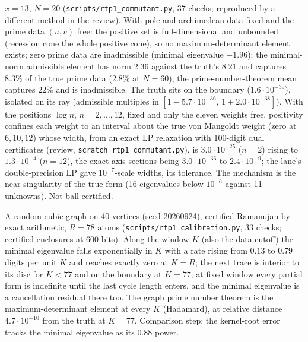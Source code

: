 \begin{numerical}
\label{num:rtp-commutant}
$x = 13$, $N = 20$ (\texttt{scripts/rtp1\_commutant.py}, 37 checks; reproduced by a different method in the
review). With pole and archimedean data fixed and the prime data $(u,v)$ free: the positive set is
full-dimensional and unbounded (recession cone the whole positive cone), so no maximum-determinant element
exists; zero prime data are inadmissible (minimal eigenvalue $-1.96$); the minimal-norm admissible element has
norm $2.36$ against the truth's $8.21$ and captures $8.3\%$ of the true prime data ($2.8\%$ at $N = 60$); the
prime-number-theorem mean captures $22\%$ and is inadmissible. The truth sits on the boundary
($1.6\cdot10^{-39}$), isolated on its ray (admissible multiples in $[1-5.7\cdot10^{-36},\,1+2.0\cdot10^{-38}]$).
With the positions $\log n$, $n = 2,\dots,12$, fixed and only the eleven weights free, positivity confines each
weight to an interval about the true von Mangoldt weight (zero at $6, 10, 12$) whose width, from an exact
LP relaxation with 100-digit dual certificates (review, \texttt{scratch\_rtp1\_commutant.py}), is
$3.0\cdot10^{-25}$ ($n = 2$) rising to $1.3\cdot10^{-4}$ ($n = 12$), the exact axis sections being $3.0\cdot10^{-36}$
to $2.4\cdot10^{-9}$; the lane's double-precision LP gave $10^{-7}$-scale widths, its tolerance. The mechanism is the near-singularity of the true form (16
eigenvalues below $10^{-6}$ against 11 unknowns). Not ball-certified.
\end{numerical}

\begin{numerical}
\label{num:rtp-calibration}
A random cubic graph on 40 vertices (seed 20260924), certified Ramanujan by exact arithmetic, $R = 78$ atoms
(\texttt{scripts/rtp1\_calibration.py}, 33 checks; certified enclosures at 600 bits). Along the window $K$ (also
the data cutoff) the minimal eigenvalue falls exponentially in $K$ with a rate rising from $0.13$ to $0.79$
digits per unit $K$ and reaches exactly zero at $K = R$; the next trace is interior to its disc for $K<77$ and
on the boundary at $K = 77$; at fixed window every partial form is indefinite until the last cycle length
enters, and the minimal eigenvalue is a cancellation residual there too. The graph prime number theorem is the
maximum-determinant element at every $K$ (Hadamard), at relative distance $4.7\cdot10^{-10}$ from the truth at
$K = 77$. Comparison step: the kernel-root error tracks the minimal eigenvalue as its $0.88$ power.
\end{numerical}

